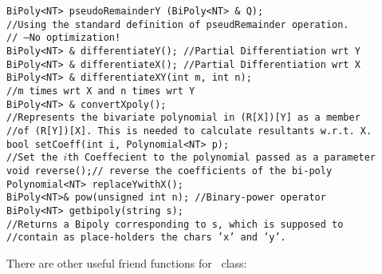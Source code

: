 \begin{progb}
{\> \tt  BiPoly<NT>  pseudoRemainderY (BiPoly<NT> \& Q);\\
\> \>   //Using the standard definition of pseudRemainder operation.\\
\> \>   //	--No optimization!\\
\> \tt  BiPoly<NT> \& differentiateY();  //Partial Differentiation wrt Y\\
\> \tt  BiPoly<NT> \& differentiateX();  //Partial Differentiation wrt X\\
\> \tt  BiPoly<NT> \& differentiateXY(int m, int n);\\
\> \> //m times wrt X and n times wrt Y\\
\> \tt  BiPoly<NT> \& convertXpoly();\\
\> \>   //Represents the bivariate polynomial in (R[X])[Y] as a member\\
\> \>   //of (R[Y])[X].  This is needed to calculate resultants w.r.t. X.\\
\> \tt   bool setCoeff(int i, Polynomial<NT> p);\\
\> \>   //Set the $i$th Coeffecient to the polynomial passed as a parameter\\
\> \tt  void reverse();// reverse the coefficients of the bi-poly\\
\> \tt  Polynomial<NT> replaceYwithX();\\
\> \tt  BiPoly<NT>\& pow(unsigned int n);  //Binary-power operator\\
\> \tt  BiPoly<NT> getbipoly(string s);\\
\> \>   //Returns a Bipoly corresponding to s, which is supposed to\\
\> \>   //contain as place-holders the chars 'x' and 'y'.\\
}\end{progb}

There are other useful friend functions for \BiPoly\ class:

